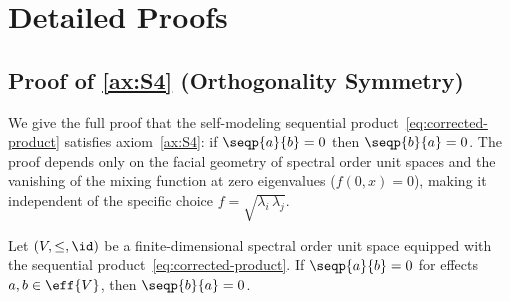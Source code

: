 
\section{Detailed Proofs}\label{app:proofs}

\subsection{Proof of \ref{ax:S4} (Orthogonality Symmetry)}
\label{app:S4-proof}

We give the full proof that the self-modeling sequential
product~\eqref{eq:corrected-product} satisfies axiom~\ref{ax:S4}: if
$\seqp{a}{b} = 0$ then $\seqp{b}{a} = 0$.  The proof depends only on the
facial geometry of spectral order unit spaces and the vanishing of the
mixing function at zero eigenvalues ($f(0, x) = 0$), making it
independent of the specific choice $f = \sqrt{\lambda_{i}\,
\lambda_{j}}$.

\begin{theorem}\label{thm:S4-full}
Let $(V, \leq, \id)$ be a finite-dimensional spectral order unit
space equipped with the sequential product~\eqref{eq:corrected-product}.
If $\seqp{a}{b} = 0$ for effects $a, b \in \eff{V}$, then
$\seqp{b}{a} = 0$.
\end{theorem}

